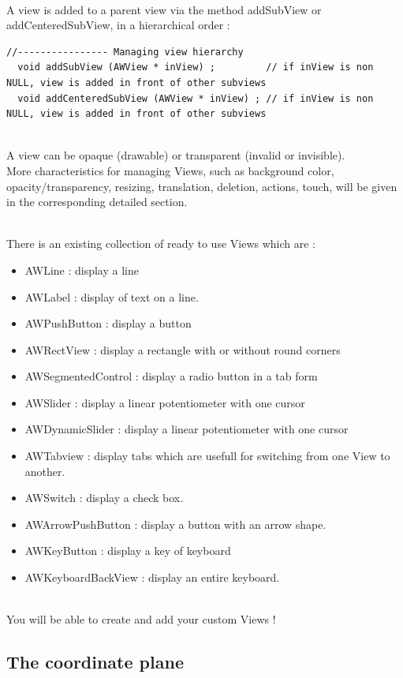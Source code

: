 \documentclass[a4paper,11pt]{extarticle}
\begin{document}
~\\ A view is added to a parent view via the method addSubView or addCenteredSubView, in a hierarchical order :
\begin{lstlisting}[language=Arduinonl]
//---------------- Managing view hierarchy
  void addSubView (AWView * inView) ;         // if inView is non NULL, view is added in front of other subviews
  void addCenteredSubView (AWView * inView) ; // if inView is non NULL, view is added in front of other subviews
\end{lstlisting}

~\\ A view can be opaque (drawable) or transparent (invalid or invisible).
~\\ More characteristics for managing Views, such as background color, opacity/transparency, resizing, translation, deletion, actions, touch, will be given in the corresponding detailed section.

~\\ There is an existing collection of ready to use Views which are :
\begin{itemize}
\item AWLine : display a line
\item AWLabel : display of text on a line.
\item AWPushButton : display a button
\item AWRectView : display a rectangle with or without round corners
\item AWSegmentedControl : display a radio button in a tab form
\item AWSlider : display a linear potentiometer with one cursor
\item AWDynamicSlider : display a linear potentiometer with one cursor
\item AWTabview : display tabs which are usefull for switching from one View to another. 
\item AWSwitch : display a check box. 
\item AWArrowPushButton : display a button with an arrow shape. 
\item AWKeyButton : display a key of keyboard 
\item AWKeyboardBackView : display an entire keyboard. 
\end{itemize}

~\\ You will be able to create and add your custom Views !


\subsection{The coordinate plane}
\end{document}
